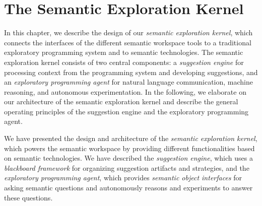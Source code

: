 
\chapter{The Semantic Exploration Kernel}
\label{cha:design}

In this chapter, we describe the design of our \emph{semantic exploration kernel}, which connects the interfaces of the different semantic workspace tools to a traditional exploratory programming system and to semantic technologies.
The semantic exploration kernel consists of two central components: a \emph{suggestion engine} for processing context from the programming system and developing suggestions, and an \emph{exploratory programming agent} for natural language communication, machine reasoning, and autonomous experimentation.
In the following, we elaborate on our architecture of the semantic exploration kernel and describe the general operating principles of the suggestion engine and the exploratory programming agent.


\begin{summary}
	We have presented the design and architecture of the \emph{semantic exploration kernel}, which powers the semantic workspace by providing different functionalities based on semantic technologies.
	We have described the \emph{suggestion engine}, which uses a \emph{blackboard framework} for organizing suggestion artifacts and strategies, and the \emph{exploratory programming agent}, which provides \emph{semantic object interfaces} for asking semantic questions and autonomously reasons and experiments to answer these questions.
\end{summary}

